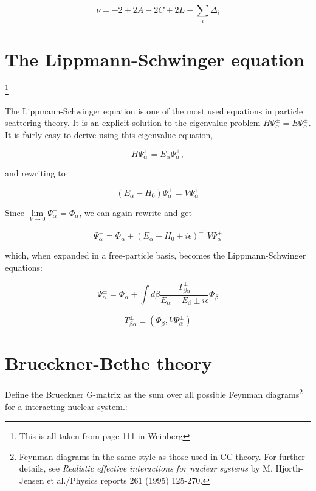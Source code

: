 \documentclass[10pt]{report}
\begin{document}
	\begin{equation}
		\nu = -2+2A-2C+2L+\sum_i\Delta_i
	\end{equation}
	
	\section{The Lippmann-Schwinger equation}\footnote{This is all taken from page 111 in Weinberg}
	
	The Lippmann-Schwinger equation is one of the most used equations in particle scattering theory. It is an explicit solution to the eigenvalue problem $H\Psi_\alpha^\pm = E\Psi_\alpha^\pm$. It is fairly easy to derive using this eigenvalue equation,
	
	\begin{equation}
		H\Psi_\alpha^\pm = E_\alpha\Psi_\alpha^\pm,
	\end{equation}
	
	and rewriting to
	
	\begin{equation}
		(E_\alpha - H_0)\Psi_\alpha^\pm = V\Psi_\alpha^\pm
	\end{equation}
	
	Since $\lim\limits_{V\rightarrow0} \Psi_\alpha^\pm = \Phi_\alpha$, we can again rewrite and get
	
	\begin{equation}
		\Psi_\alpha^\pm = \Phi_\alpha + (E_\alpha - H_0 \pm i\epsilon)^{-1}V\Psi_\alpha^\pm
	\end{equation}
		
	which, when expanded in a free-particle basis, becomes the Lippmann-Schwinger equations:
	
	\begin{equation}
		\Psi_\alpha^\pm = \Phi_\alpha + \int d\beta \frac{T_{\beta\alpha}^\pm}{E_\alpha - E_\beta \pm i\epsilon}\Phi_\beta
	\end{equation}
	
	\begin{equation}
		T_{\beta\alpha}^\pm \equiv \left(\Phi_\beta,V\Psi_\alpha^\pm\right)
	\end{equation}
		
	\section{Brueckner-Bethe theory}
	
	Define the Brueckner G-matrix as the sum over all possible Feynman diagrams\footnote{Feynman diagrams in the same style as those used in CC theory. For further details, see \emph{Realistic effective interactions for nuclear systems} by M. Hjorth-Jensen et al./Physics reports 261 (1995) 125-270.} for a interacting nuclear system.:
	
\end{document}

